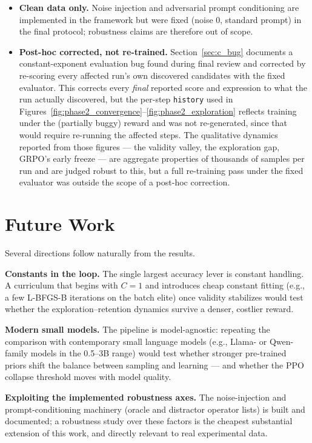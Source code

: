 \begin{itemize}
    \item \textbf{Clean data only.} Noise injection and adversarial prompt conditioning are implemented in the framework but were fixed (noise 0, standard prompt) in the final protocol; robustness claims are therefore out of scope.
    \item \textbf{Post-hoc corrected, not re-trained.} Section~\ref{sec:c_bug} documents a constant-exponent evaluation bug found during final review and corrected by re-scoring every affected run's own discovered candidates with the fixed evaluator. This corrects every \emph{final} reported score and expression to what the run actually discovered, but the per-step \texttt{history} used in Figures~\ref{fig:phase2_convergence}--\ref{fig:phase2_exploration} reflects training under the (partially buggy) reward and was not re-generated, since that would require re-running the affected steps. The qualitative dynamics reported from those figures --- the validity valley, the exploration gap, GRPO's early freeze --- are aggregate properties of thousands of samples per run and are judged robust to this, but a full re-training pass under the fixed evaluator was outside the scope of a post-hoc correction.
\end{itemize}

\section{Future Work}

Several directions follow naturally from the results.

\textbf{Constants in the loop.} The single largest accuracy lever is constant handling. A curriculum that begins with $C=1$ and introduces cheap constant fitting (e.g., a few L-BFGS-B iterations on the batch elite) once validity stabilizes would test whether the exploration--retention dynamics survive a denser, costlier reward.

\textbf{Modern small models.} The pipeline is model-agnostic: repeating the comparison with contemporary small language models (e.g., Llama- or Qwen-family models in the 0.5--3B range) would test whether stronger pre-trained priors shift the balance between sampling and learning --- and whether the PPO collapse threshold moves with model quality.

\textbf{Exploiting the implemented robustness axes.} The noise-injection and prompt-conditioning machinery (oracle and distractor operator lists) is built and documented; a robustness study over these factors is the cheapest substantial extension of this work, and directly relevant to real experimental data.

